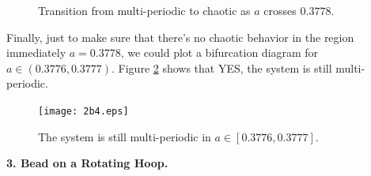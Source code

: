 \documentclass{article}
\theoremstyle{definition}
\begin{document}
\begin{enumerate}[label=(\alph*)]
	\begin{figure}[!htb]
		\centering
		\hspace{0mm}
		\caption{Transition from multi-periodic to chaotic as $a$ crosses $0.3778$.}
		\label{fig:2b3}
	\end{figure}
	Finally, just to make sure that there's no chaotic behavior in the region immediately $a = 0.3778$, we could plot a bifurcation diagram for $a\in (0.3776, 0.3777)$. Figure \ref{fig:2b4} shows that YES, the system is still multi-periodic. 
	
	\begin{figure}[!htb]
		\centering
		\texttt{[image: 2b4.eps]}
		\caption{The system is still multi-periodic in $a\in [0.3776, 0.3777]$.}
		\label{fig:2b4}
	\end{figure}
\end{enumerate}



\newpage

\noindent \textbf{3. Bead on a Rotating Hoop.}
\end{document}
